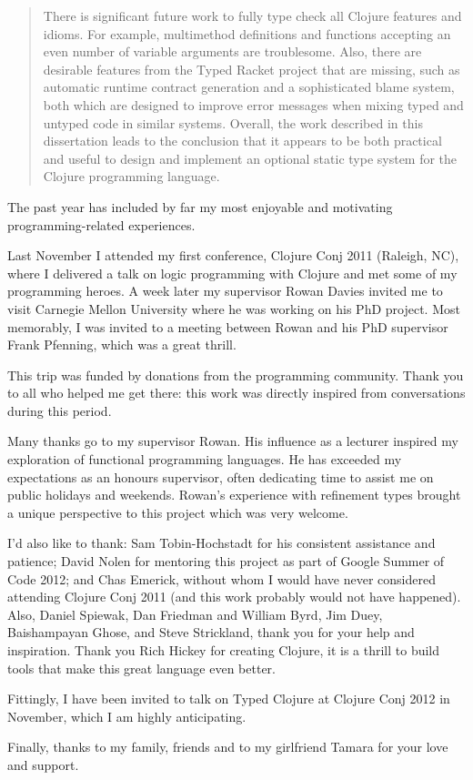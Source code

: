 \documentclass{cshonours}
\begin{document}
\begin{abstract}
There is significant future work to fully type check all Clojure features and idioms.
For example, multimethod definitions and functions accepting an even number of variable arguments
are troublesome. 
Also, there are desirable features from the Typed Racket project that are missing, such
as automatic runtime contract generation and a sophisticated blame system, 
both which are designed to improve error messages when mixing typed and untyped code in similar systems.
Overall, the work described in this dissertation leads to the conclusion that it appears to 
be both practical and useful to design and implement an optional static type system for the
Clojure programming language.

\end{abstract}

\begin{acknowledgements}

The past year has included by far my most enjoyable and motivating programming-related experiences.

Last November I attended my first conference, Clojure Conj 2011 (Raleigh, NC),
where I delivered a talk on logic programming with Clojure and met some of my programming heroes.
A week later my supervisor Rowan Davies invited me to visit Carnegie Mellon University
where he was working on his PhD project. Most memorably, I was invited to a meeting between
Rowan and his PhD supervisor Frank Pfenning, which was a great thrill.

This trip was funded by donations from the programming community. Thank you to all who helped me get there:
this work was directly inspired from conversations during this period.

Many thanks go to my supervisor Rowan. His influence as a lecturer inspired my exploration of
functional programming languages. He has exceeded my expectations as an honours supervisor,
often dedicating time to assist me on public holidays and weekends.
Rowan's experience with refinement types brought a unique perspective to this project
which was very welcome.

I'd also like to thank: Sam Tobin-Hochstadt for his consistent assistance and patience;
David Nolen for mentoring this project as part of Google Summer of Code 2012;
and Chas Emerick, without whom I would have never considered attending Clojure Conj 2011
(and this work probably would not have happened).
Also, Daniel Spiewak, Dan Friedman and William Byrd, Jim Duey, Baishampayan Ghose, and
Steve Strickland, thank you for your help and inspiration.
Thank you Rich Hickey for creating Clojure, it is a thrill to build tools that make
this great language even better.

Fittingly, I have been invited to talk on Typed Clojure at Clojure Conj
2012 in November, which I am highly anticipating.

Finally, thanks to my family, friends and to my girlfriend Tamara for your love and support.

\end{acknowledgements}
\end{document}
